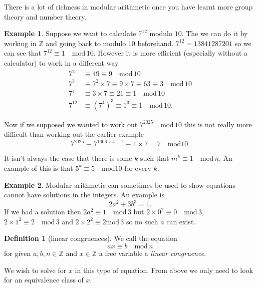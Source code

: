 \documentclass[
]{book}
\theoremstyle{definition}
\newtheorem{definition}{Definition}[chapter]
\theoremstyle{definition}
\newtheorem{example}{Example}[chapter]
\theoremstyle{definition}
\theoremstyle{definition}
\theoremstyle{remark}
\begin{document}
There is a lot of richness in modular arithmetic once you have learnt more group theory and number theory.

\begin{example}
Suppose we want to calculate \(7^{12}\) modulo \(10\). The we can do it by working in \(\mathbb{Z}\) and going back to modulo \(10\) beforehand. \(7^{12} = 13841287201\) so we can see that \(7^{12} \equiv 1 \quad \mbox{mod} \, 10\). However it is more efficient (especially without a calculator) to work in a different way
\begin{align*}
7^2 &\equiv 49 \equiv 9 \quad \mbox{mod} \, 10 \\
7^3 & \equiv 7^2 \times 7 \equiv 9 \times 7 \equiv 63 \equiv 3 \quad \mbox{mod} \, 10\\
7^4 & \equiv 3\times 7 \equiv 21 \equiv 1 \quad \mbox{mod} \, 10\\
7^{12} &\equiv (7^4)^3 \equiv 1^3 \equiv 1 \quad \mbox{mod}\, 10.
\end{align*}

Now if we supposed we wanted to work out \(7^{2025} \quad \mbox{mod} \, 10\) this is not really more difficult than working out the earlier example
\[ 7^{2025} \equiv 7^{1006\times 4 +1} \equiv 1\times 7 = 7 \quad \mbox{mod} 10.  \]

It isn't always the case that there is some \(k\) such that \(m^k \equiv 1 \quad \mbox{mod} \,n\). An example of this is that \(5^k \equiv 5 \quad \mbox{mod} 10\) for every \(k\).
\end{example}

\begin{example}
Modular arithmetic can sometimes be used to show equations cannot have solutions in the integers. An example is
\[ 2a^2 + 3b^3 = 1.  \]
If we had a solution then \(2a^2 \equiv 1 \quad \mbox{mod} \, 3\) but \(2\times 0^2 \equiv 0 \quad \mbox{mod} \, 3\), \(2 \times 1^2 \equiv 2 \quad \mbox{mod} \, 3\) and \(2 \times 2^2 \equiv 2 \mbox{mod} \, 3\) so no such \(a\) can exist.
\end{example}

\begin{definition}[linear congruences]
We call the equation
\[ ax \equiv b \quad \mbox{mod} \, n  \]
for given \(a, b, n \in \mathbb{Z}\) and \(x \in \mathbb{Z}\) a free variable a \emph{linear congruence}.

We wish to solve for \(x\) in this type of equation. From above we only need to look for an equivalence class of \(x\).
\end{definition}
\end{document}
